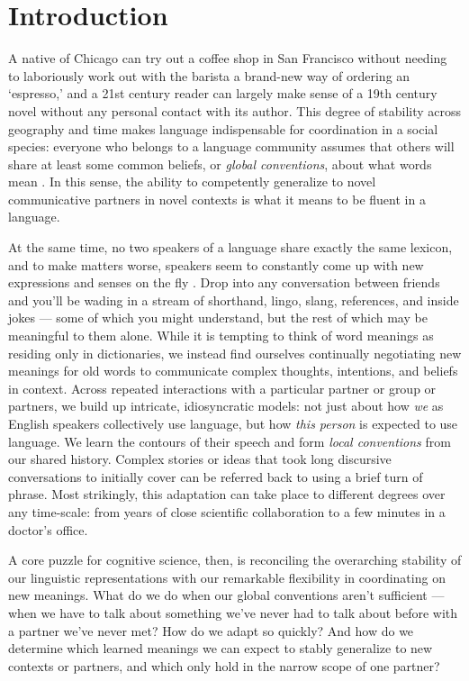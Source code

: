 \chapter{Introduction}
\label{introduction}
\graphicspath{{./figures/introduction/}}

 A native of Chicago can try out a coffee shop in San Francisco without needing to laboriously work out with the barista a brand-new way of ordering an `espresso,' and a 21st century reader can largely make sense of a 19th century novel without any personal contact with its author. This degree of stability across geography and time makes language indispensable for coordination in a social species: everyone who belongs to a language community assumes that others will share at least some common beliefs, or \emph{global conventions}, about what words mean \cite{Lewis69_Convention}. In this sense, the ability to competently generalize to novel communicative partners in novel contexts is what it means to be fluent in a language.

At the same time, no two speakers of a language share exactly the same lexicon, and to make matters worse, speakers seem to constantly come up with new expressions and senses on the fly \cite{Davidson86_DerangementOfEpitaphs, Clark98_CommunalLexicons}. Drop into any conversation between friends and you’ll be wading in a stream of shorthand, lingo, slang, references, and inside jokes --- some of which you might understand, but the rest of which may be meaningful to them alone. While it is tempting to think of word meanings as residing only in dictionaries, we instead find ourselves continually negotiating new meanings for old words to communicate complex thoughts, intentions, and beliefs in context. Across repeated interactions with a particular partner or group or partners, we build up intricate, idiosyncratic models: not just about how \emph{we} as English speakers collectively use language, but how \emph{this person} is expected to use language. We learn the contours of their speech and form \emph{local conventions} from our shared history. Complex stories or ideas that took long discursive conversations to initially cover can be referred back to using a brief turn of phrase. Most strikingly, this adaptation can take place to different degrees over any time-scale: from years of close scientific collaboration to a few minutes in a doctor's office.

A core puzzle for cognitive science, then, is reconciling the overarching stability of our linguistic representations with our remarkable flexibility in coordinating on new meanings. 
What do we do when our global conventions aren't sufficient --- when we have to talk about something we've never had to talk about before with a partner we've never met? 
How do we adapt so quickly? 
And how do we determine which learned meanings we can expect to stably generalize to new contexts or partners, and which only hold in the narrow scope of one partner?

